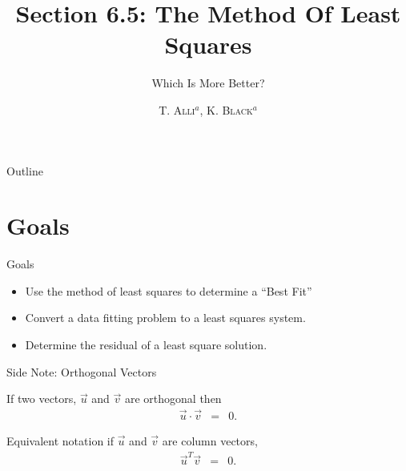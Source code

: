 \documentclass[svgnames,table,,aspectratio=169]{beamer}
\begin{document}
\author{\textsc{T. Alli$^{a}$, K. Black$^{a}$}}
\subject{Linear Algebra}


\title{Section 6.5: The Method Of Least Squares}
\subtitle{Which Is More Better?}


\date{} %

\begin{frame}
  \titlepage
\end{frame}

\begin{frame}{Outline}
  \tableofcontents
\end{frame}


\section{Goals}

\begin{frame}{Goals}

  \begin{itemize}
  \item Use the method of  least squares to determine a ``Best Fit''
  \item Convert a data fitting problem to a least squares system.
  \item Determine the residual of a least square solution.
  \end{itemize}

\end{frame}

\begin{frame}{Side Note: Orthogonal Vectors}

  If two vectors, $\vec{u}$ and $\vec{v}$ are orthogonal then
  \begin{eqnarray*}
    \vec{u} \cdot \vec{v} & = & 0.
  \end{eqnarray*}

  Equivalent notation if $\vec{u}$ and $\vec{v}$ are column vectors,
  \begin{eqnarray*}
    \vec{u}^T \vec{v} & = & 0.
  \end{eqnarray*}
  
\end{frame}
\end{document}
